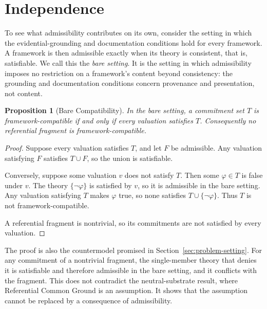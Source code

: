\documentclass[11pt]{article}
\theoremstyle{plain}
\newtheorem{proposition}[theorem]{Proposition}
\theoremstyle{definition}
\theoremstyle{remark}
\newcommand{\SecRef}[1]{Section~\ref{#1}}
\newcommand{\Framework}{F}
\begin{document}
\section{Independence}
\label{sec:independence}

To see what admissibility contributes on its own, consider the setting in which
the evidential-grounding and documentation conditions hold for every framework.
A framework is then admissible exactly when its theory is consistent, that is,
satisfiable.
We call this the \emph{bare setting}.
It is the setting in which admissibility imposes no restriction on a
framework's content beyond consistency: the grounding and documentation
conditions concern provenance and presentation, not content.

\begin{proposition}[Bare Compatibility]
  \label{se110.proposition.CompatibleBareIffValid}
  In the bare setting, a commitment set $T$ is framework-compatible if and only
  if every valuation satisfies $T$.
  Consequently no referential fragment is framework-compatible.
\end{proposition}

\begin{proof}
  Suppose every valuation satisfies $T$, and let $\Framework$ be admissible.
  Any valuation satisfying $\Framework$ satisfies $T \cup \Framework$, so the
  union is satisfiable.

  Conversely, suppose some valuation $v$ does not satisfy $T$.
  Then some $\varphi \in T$ is false under $v$.
  The theory $\{\neg\varphi\}$ is satisfied by $v$, so it is admissible in the
  bare setting.
  Any valuation satisfying $T$ makes $\varphi$ true, so none satisfies
  $T \cup \{\neg\varphi\}$.
  Thus $T$ is not framework-compatible.

  A referential fragment is nontrivial, so its commitments are not satisfied
  by every valuation.
\end{proof}

The proof is also the countermodel promised in \SecRef{sec:problem-setting}.
For any commitment of a nontrivial fragment, the single-member theory that
denies it is satisfiable and therefore admissible in the bare setting, and it
conflicts with the fragment.
This does not contradict the neutral-substrate result, where Referential Common
Ground is an assumption.
It shows that the assumption cannot be replaced by a consequence of
admissibility.
\end{document}
